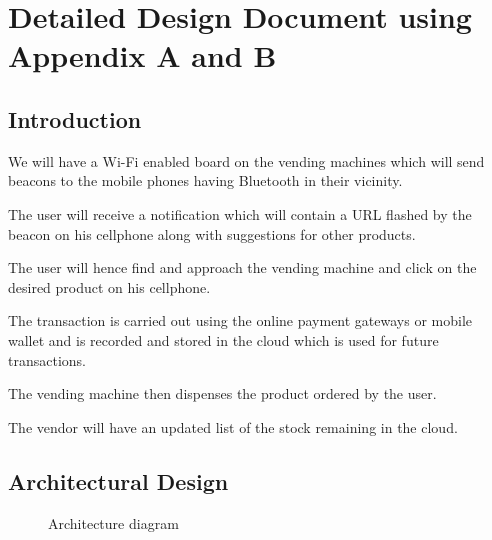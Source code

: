 \documentclass[oneside,a4paper,12pt]{report}
\begin{document}
\chapter{Detailed Design Document using Appendix A and B}
 \section{Introduction}  
 We will have a Wi-Fi enabled board on the vending machines which will send beacons to the mobile phones having Bluetooth in their vicinity.
 
 The user will receive a notification which will contain a URL flashed by the beacon on his cellphone along with suggestions for other products.

The user will hence find and approach the vending machine and click on the desired product on his cellphone.

 The transaction is carried out using the online payment gateways or mobile wallet and is recorded and stored in the cloud which is used for future transactions.

 The vending machine then dispenses the product ordered by the user.

The vendor will have an updated list of the stock remaining in the cloud.  
\section{Architectural Design}  

 
  \begin{center}
	\begin{figure}[!htbp]
		\centering
	  \caption{Architecture diagram}
	  \label{fig:arch-dig}
	\end{figure}
\end{center} 
\newpage
\end{document}
